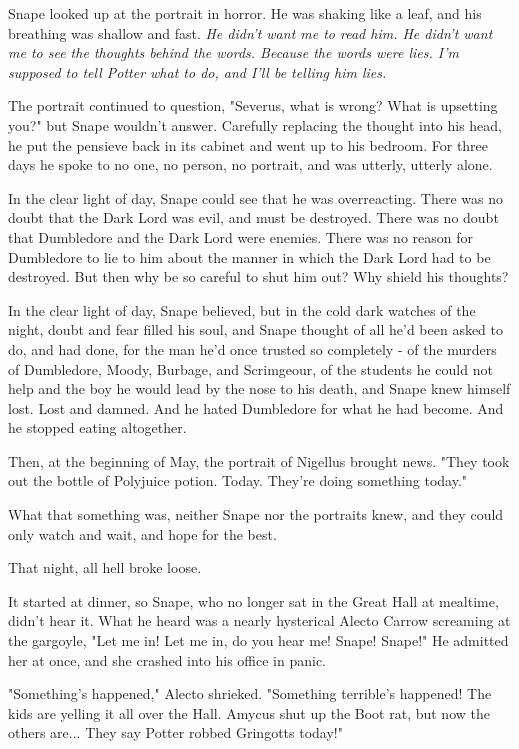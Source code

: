 \documentclass[a4paper,11pt]{article}
\begin{document}
Snape looked up at the portrait in horror. He was shaking like a leaf, and his breathing was shallow and fast. \emph{He didn't want me to read him. He didn't want me to see the thoughts behind the words. Because the words were lies. I'm supposed to tell Potter what to do, and I'll be telling him lies.}

The portrait continued to question, "Severus, what is wrong? What is upsetting you?" but Snape wouldn't answer. Carefully replacing the thought into his head, he put the pensieve back in its cabinet and went up to his bedroom. For three days he spoke to no one, no person, no portrait, and was utterly, utterly alone.

In the clear light of day, Snape could see that he was overreacting. There was no doubt that the Dark Lord was evil, and must be destroyed. There was no doubt that Dumbledore and the Dark Lord were enemies. There was no reason for Dumbledore to lie to him about the manner in which the Dark Lord had to be destroyed. But then why be so careful to shut him out? Why shield his thoughts?

In the clear light of day, Snape believed, but in the cold dark watches of the night, doubt and fear filled his soul, and Snape thought of all he'd been asked to do, and had done, for the man he'd once trusted so completely - of the murders of Dumbledore, Moody, Burbage, and Scrimgeour, of the students he could not help and the boy he would lead by the nose to his death, and Snape knew himself lost. Lost and damned. And he hated Dumbledore for what he had become. And he stopped eating altogether.

Then, at the beginning of May, the portrait of Nigellus brought news. "They took out the bottle of Polyjuice potion. Today. They're doing something today."

What that something was, neither Snape nor the portraits knew, and they could only watch and wait, and hope for the best.

That night, all hell broke loose.

It started at dinner, so Snape, who no longer sat in the Great Hall at mealtime, didn't hear it. What he heard was a nearly hysterical Alecto Carrow screaming at the gargoyle, "Let me in! Let me in, do you hear me! Snape! Snape!" He admitted her at once, and she crashed into his office in panic.

"Something's happened," Alecto shrieked. "Something terrible's happened! The kids are yelling it all over the Hall. Amycus shut up the Boot rat, but now the others are... They say Potter robbed Gringotts today!"
\end{document}
